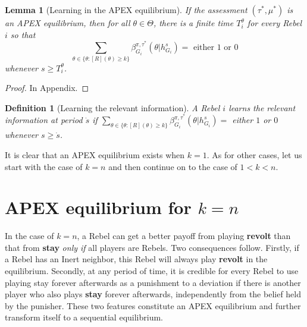 \documentclass[12pt,letter]{article}
\newtheorem{lemma}{Lemma}[section]
\newtheorem{definition}{Definition}[section]
\theoremstyle{definition}
\theoremstyle{remark}
\theoremstyle{claim}
\begin{document}
\begin{lemma}[Learning in the APEX equilibrium]\label{lemma_learn}
If the assessment $(\tau^*,\mu^{*})$ is an APEX equilibrium, then for all $\theta\in \Theta$, there is a finite time $T^{\theta}_i$ for every Rebel $i$ so that
\[\sum_{\theta\in\{\theta:[R](\theta)\geq k\}}\beta^{\pi,\tau^*}_{G_i}(\theta|h^{s}_{G_i})= \text{ either } 1 \text{ or } 0\]
whenever $s\geq T^{\theta}_i$.
\end{lemma}

\begin{proof}
In Appendix.
\end{proof}

\begin{definition}[Learning the relevant information]\label{def_learn}
A Rebel $i$ learns the relevant information at period $\dot{s}$ if $\sum_{\theta\in\{\theta:[R](\theta)\geq k\}}\beta^{\pi,\tau^*}_{G_i}(\theta|h^{s}_{G_i})=$ either $1$ or $0$ whenever $s\geq \dot{s}$.
\end{definition}

It is clear that an APEX equilibrium exists when $k=1$. As for other cases, let us start with the case of $k=n$ and then continue on to the case of $1<k<n$.

\section{APEX equilibrium for $k=n$}
\label{sec:equilibrium_1}


In the case of $k=n$, a Rebel can get a better payoff from playing \textbf{revolt} than that from \textbf{stay} \textit{only if} all players are Rebels. Two consequences follow. Firstly, if a Rebel has an Inert neighbor, this Rebel will always play \textbf{revolt} in the equilibrium. Secondly, at any period of time, it is credible for every Rebel to use playing stay forever afterwards as a punishment to a deviation if there is another player who also plays \textbf{stay} forever afterwards, independently from the belief held by the punisher. These two features constitute an APEX equilibrium and further transform itself to a sequential equilibrium. 
\end{document}
